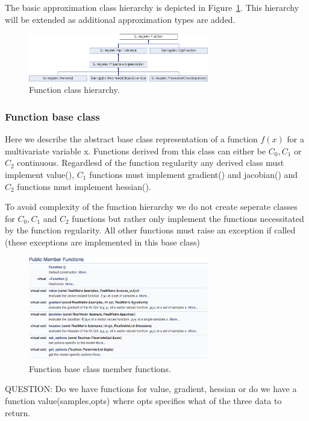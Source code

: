 \documentclass[dakotalogo]{dakota-article}
\begin{document}
The basic approximation class hierarchy is depicted in Figure~\ref{fig:approx-class-hierarcy}. This hierarchy will be extended as additional approximation types are added.

\begin{figure}[htb]\centering
\includegraphics[width=0.7\textwidth]{classSurrogates_1_1Function.png}
\caption{Function class hierarchy.}
\label{fig:approx-class-hierarcy}
\end{figure}  

\subsubsection{Function base class}

Here we describe the abstract base class representation of a function $f(x)$ for a multivariate variable x.
Functions derived from this class can either be $C_0, C_1$ or $C_2$
 continuous. Regardlesd of the function regularity any derived class must
implement value(), $C_1$ functions must implement gradient() and jacobian()
and $C_2$ functions must implement hessian().

To avoid complexity of the function hierarchy we do not create seperate classes
for  $C_0, C_1$ and $C_2$ functions but rather only implement the
functions necessitated by the function regularity. All other functions must
raise an exception if called (these exceptions are implemented in this base
class)
\begin{figure}[htb]\centering
\includegraphics[width=0.7\textwidth]{function-class-members.png}
\caption{Function base class member functions.}
\end{figure}

QUESTION: Do we have functions for value, gradient, hessian or do we
have a function value(samples,opts) where opts specifies what of the
three data to return.
\end{document}
